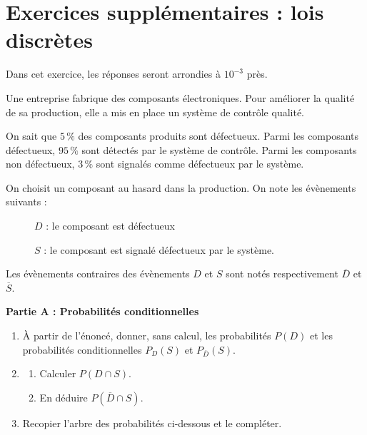 \documentclass[TC, exos, e,p]{phBook}
\begin{document}
\setcounter{chapter}{6} %
\chapter{Exercices supplémentaires : lois discrètes}


\begin{exercice}
    \begin{enonce}
        Dans cet exercice, les réponses seront arrondies à $10^{-3}$ près.

Une entreprise fabrique des composants électroniques. Pour améliorer la qualité de sa production, elle a mis en place un système de contrôle qualité.

On sait que $5\,\%$ des composants produits sont défectueux. Parmi les composants défectueux, $95\,\%$ sont détectés par le système de contrôle. Parmi les composants non défectueux, $3\,\%$ sont signalés comme défectueux par le système.

\bigskip

On choisit un composant au hasard dans la production. On note les évènements suivants :

\begin{description}
\item[ ] $D$ : \og le composant est défectueux\fg{}
\item[ ] $S$ : \og le composant est signalé défectueux par le système\fg{}.
\end{description}

Les évènements contraires des évènements $D$ et $S$ sont notés respectivement $\overline{D}$ et $\overline{S}$.

\bigskip

\textbf{Partie A : Probabilités conditionnelles}

\begin{enumerate}
\item À partir de l'énoncé, donner, sans calcul, les probabilités $P(D)$ et les probabilités conditionnelles $P_D(S)$ et $P_{\overline{D}}(S)$.

\item
	\begin{enumerate}
		\item Calculer $P(D \cap S)$.
		\item En déduire $P\left(\overline{D} \cap S\right)$.
	\end{enumerate}

\item Recopier l'arbre des probabilités ci-dessous et le compléter.


\end{enumerate}
\end{enonce}
\end{exercice}
\end{document}
